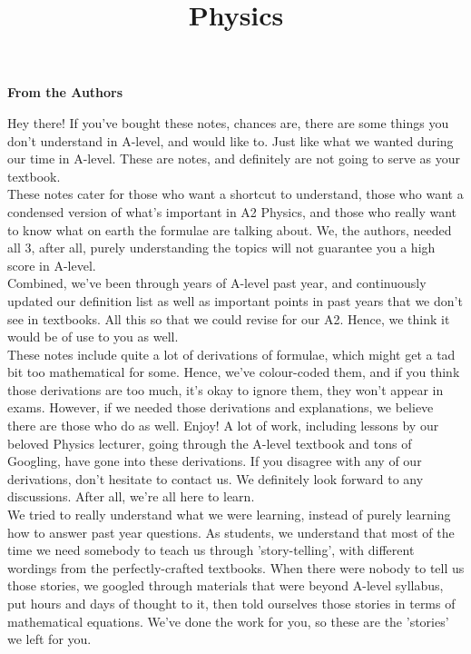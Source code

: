 \documentclass{article}
\title{
\textbf{Physics}
}
\date{}
\begin{document}
\NoBgThispage



\newpage
\begin{flushleft}
\textbf{From the Authors}
\end{flushleft}

Hey there! If you've bought these notes, chances are, there are some things you don't understand in A-level, and would like to. Just like what we wanted during our time in A-level. These are notes, and definitely are not going to serve as your textbook. \\

These notes cater for those who want a shortcut to understand, those who want a condensed version of what's important in A2 Physics, and those who really want to know what on earth the formulae are talking about. We, the authors, needed all 3, after all, purely understanding the topics will not guarantee you a high score in A-level.\\

Combined, we've been through years of A-level past year, and continuously updated our definition list as well as important points in past years that we don't see in textbooks. All this so that we could revise for our A2. Hence, we think it would be of use to you as well.\\

These notes include quite a lot of derivations of formulae, which might get a tad bit too mathematical for some. Hence, we've colour-coded them, and if you think those derivations are too much, it's okay to ignore them, they won't appear in exams. However, if we needed those derivations and explanations, we believe there are those who do as well. Enjoy! A lot of work, including lessons by our beloved Physics lecturer, going through the A-level textbook and tons of Googling, have gone into these derivations. If you disagree with any of our derivations, don't hesitate to contact us. We definitely look forward to any discussions. After all, we're all here to learn.\\

We tried to really understand what we were learning, instead of purely learning how to answer past year questions. As students, we understand that most of the time we need somebody to teach us through 'story-telling', with different wordings from the perfectly-crafted textbooks. When there were nobody to tell us those stories, we googled through materials that were beyond A-level syllabus, put hours and days of thought to it, then told ourselves those stories in terms of mathematical equations. We've done the work for you, so these are the 'stories' we left for you.\\  
\end{document}
